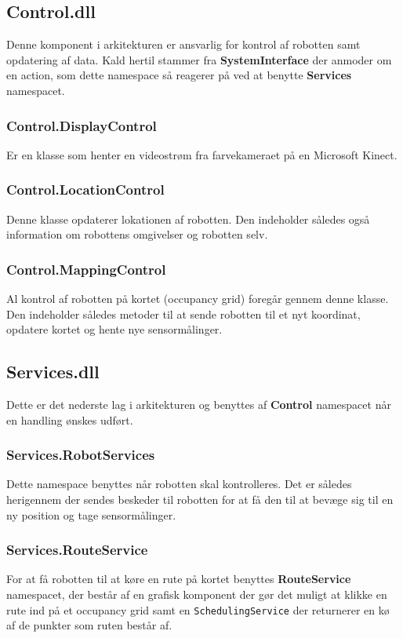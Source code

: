 \subsection{Control.dll}\label{arkitektur:control}
Denne komponent i arkitekturen er ansvarlig for kontrol af robotten samt opdatering af data.
Kald hertil stammer fra \textbf{SystemInterface} der anmoder om en action, som dette namespace så reagerer på ved at benytte \textbf{Services} namespacet.

\subsubsection{Control.DisplayControl}
Er en klasse som henter en videostrøm fra farvekameraet på en Microsoft Kinect.

\subsubsection{Control.LocationControl}
Denne klasse opdaterer lokationen af robotten.
Den indeholder således også information om robottens omgivelser og robotten selv.

\subsubsection{Control.MappingControl}
Al kontrol af robotten på kortet (occupancy grid) foregår gennem denne klasse.
Den indeholder således metoder til at sende robotten til et nyt koordinat, opdatere kortet og hente nye sensormålinger.

\subsection{Services.dll}\label{arkitektur:services}
Dette er det nederste lag i arkitekturen og benyttes af \textbf{Control} namespacet når en handling ønskes udført.

\subsubsection{Services.RobotServices}
Dette namespace benyttes når robotten skal kontrolleres.
Det er således herigennem der sendes beskeder til robotten for at få den til at bevæge sig til en ny position og tage sensormålinger.

\subsubsection{Services.RouteService}
For at få robotten til at køre en rute på kortet benyttes \textbf{RouteService} namespacet, der består af en grafisk komponent der gør det muligt at klikke en rute ind på et occupancy grid samt en \lstinline[style=csharp]|SchedulingService| der returnerer en kø af de punkter som ruten består af.

